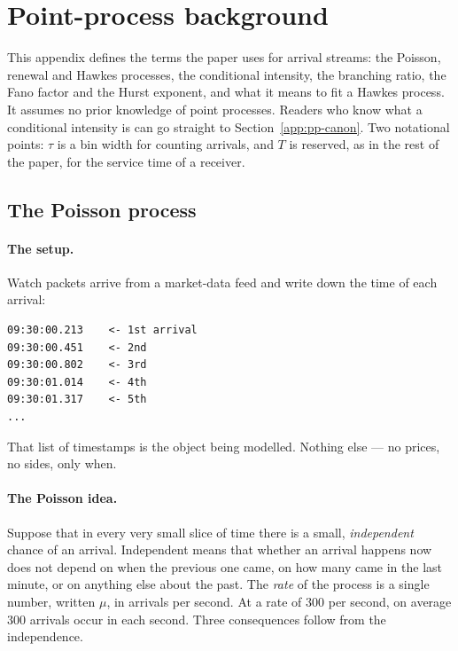 
\section{Point-process background}
\label{app:pp-background}

This appendix defines the terms the paper uses for arrival streams: the Poisson,
renewal and Hawkes processes, the conditional intensity, the branching ratio, the Fano
factor and the Hurst exponent, and what it means to fit a Hawkes process. It assumes no
prior knowledge of point processes. Readers who know what a conditional intensity is can
go straight to Section~\ref{app:pp-canon}. Two notational points: $\tau$ is a bin width
for counting arrivals, and $T$ is reserved, as in the rest of the paper, for the service
time of a receiver.

\subsection{The Poisson process}
\label{app:pp-warmup}

\paragraph{The setup.} Watch packets arrive from a market-data feed and write down the
time of each arrival:
\begin{verbatim}
09:30:00.213    <- 1st arrival
09:30:00.451    <- 2nd
09:30:00.802    <- 3rd
09:30:01.014    <- 4th
09:30:01.317    <- 5th
...
\end{verbatim}
That list of timestamps is the object being modelled. Nothing else --- no prices, no
sides, only when.

\paragraph{The Poisson idea.} Suppose that in every very small slice of time there is a
small, \emph{independent} chance of an arrival. Independent means that whether an arrival
happens now does not depend on when the previous one came, on how many came in the last
minute, or on anything else about the past. The \emph{rate} of the process is a single
number, written $\mu$, in arrivals per second. At a rate of $300$ per second, on average
$300$ arrivals occur in each second. Three consequences follow from the independence.


